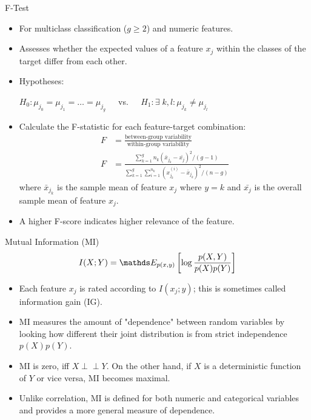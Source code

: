 \documentclass[11pt,compress,t,notes=noshow, xcolor=table]{beamer}
\begin{document}
  \begin{vbframe}{F-Test}
  \begin{itemize}
    \item For multiclass classification ($g \ge 2$) and numeric features.
    \item Assesses whether the expected values of a feature $x_j$ within the classes of the target differ from each other.
    \item Hypotheses:

    $H_0: \mu_{j_0} = \mu_{j_1} = \dots = \mu_{j_g} \;\;\;\;$ vs. $\;\;\;\;H_1 : \exists \; k,l: \mu_{j_k} \neq \mu_{j_l}$
    \item Calculate the F-statistic for each feature-target combination:
    \begin{align*}
    F &= \frac{\text{between-group variability}}{\text{within-group variability}}\\
    F &= \frac{\sum_{k = 1}^g n_k (\bar{x}_{j_k} - \bar{x_j})^2/(g-1)}{\sum_{k = 1}^g \sum_{i = 1}^{n_k} (x_{j_k}^{(i)} - \bar{x}_{j_k})^2/(n-g)}
    \end{align*}
    where $\bar{x}_{j_k}$ is the sample mean of feature $x_j$ where $y = k$ and $\bar{x_{j}}$ is the overall sample mean of feature $x_j$.
  \item A higher F-score indicates higher relevance of the feature.
  \end{itemize}
  \end{vbframe}

  \begin{vbframe}{Mutual Information (MI)}
  $$I(X ; Y) = \E_{p(x, y)} \left[ \log \frac{p(X, Y)}{p(X) p(Y)} \right]$$

  \begin{itemize}
  \setlength{\itemsep}{1.2em}
    \item Each feature $x_j$ is rated according to $I(x_j;y)$; this is sometimes called information gain (IG).
    \item MI measures the amount of "dependence" between random variables by looking how
    different their joint distribution is from strict independence $p(X)p(Y)$.
    \item MI is zero, iff $X \perp \!\!\! \perp Y$. On the other hand, if $X$ is a deterministic function of $Y$ or vice versa, MI becomes maximal.
  \item Unlike correlation, MI is defined for both numeric and categorical variables and provides a more general measure of dependence.
  \end{itemize}
  \end{vbframe}
\end{document}
